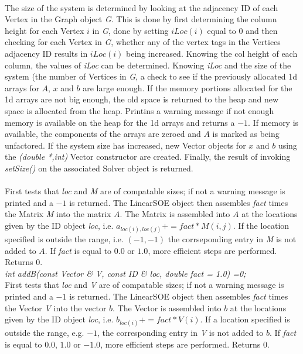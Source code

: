  \\ 
The size of the system is determined by looking at the adjacency ID of
each Vertex in the Graph object {\em G}. This is done by first
determining the column height for each Vertex $i$ in {\em G}, done by
setting $iLoc(i)$ equal to $0$ and then checking for each Vertex
in {\em G}, whether any of the vertex tags in the Vertices adjacency
ID results in $iLoc(i)$ being increased. Knowing the col height of
each column, the values of {\em iLoc} can be determined. Knowing {\em
iLoc} and the size of the system (the number of Vertices in {\em G}, 
a check to see if the previously allocated 1d arrays for $A$, $x$ and
$b$ are large enough. If the memory portions allocated for the 1d
arrays are not big enough, the old space is returned to the heap and
new space is allocated from the heap. Printins a warning message if
not enough memory is available on the heap for the 1d arrays and
returns a $-1$. If memory is available, the components of the arrays
are zeroed and $A$ is marked as being unfactored. If the system size
has increased, new Vector objects for $x$ and $b$ using the {\em
(double *,int)} Vector constructor are created. Finally, the result of 
invoking {\em setSize()} on the associated Solver object is
returned. \\ 


 \\
First tests that {\em loc} and {\em M} are of compatable sizes; if not
a warning message is printed and a $-1$ is returned. The LinearSOE
object then assembles {\em fact} times the Matrix {\em 
M} into the matrix $A$. The Matrix is assembled into $A$ at the
locations given by the ID object {\em loc}, i.e. $a_{loc(i),loc(j)} +=
fact * M(i,j)$. If the location specified is outside the range,
i.e. $(-1,-1)$ the corrseponding entry in {\em M} is not added to
$A$. If {\em fact} is equal to $0.0$ or $1.0$, more efficient steps
are performed. Returns $0$.  \\


{\em int addB(const Vector \& V, const ID \& loc,
double fact = 1.0) =0;} \\
First tests that {\em loc} and {\em V} are of compatable sizes; if not
a warning message is printed and a $-1$ is returned. The LinearSOE
object then assembles {\em fact} times the Vector {\em V} into
the vector $b$. The Vector is assembled into $b$ at the locations
given by the ID object {\em loc}, i.e. $b_{loc(i)} += fact * V(i)$. If a
location specified is outside the range, e.g. $-1$, the corresponding
entry in {\em V} is not added to $b$. If {\em fact} is equal to $0.0$,
$1.0$ or $-1.0$, more efficient steps are performed. Returns $0$. \\


